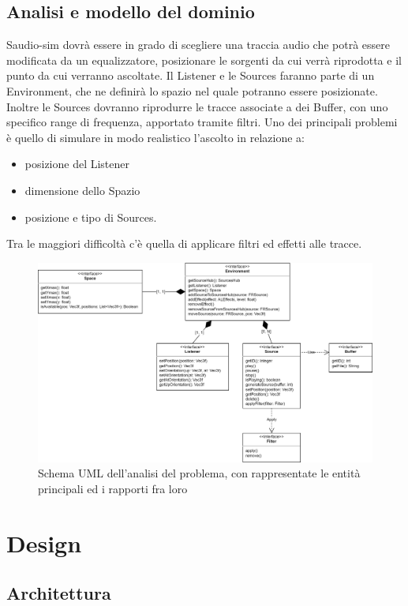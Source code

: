 \documentclass[a4paper,12pt]{report}
\begin{document}
\section{Analisi e modello del dominio}
Saudio-sim dovrà essere in grado di scegliere una traccia audio che potrà essere modificata da un equalizzatore, posizionare le sorgenti da cui verrà riprodotta e il punto da cui verranno ascoltate. Il Listener e le Sources faranno parte di un Environment, che ne definirà lo spazio nel quale potranno essere posizionate. Inoltre le Sources dovranno riprodurre le tracce associate a dei Buffer, con uno specifico range di frequenza, apportato tramite filtri.
%
Uno dei principali problemi è quello di simulare in modo realistico l'ascolto in relazione a: 
\begin{itemize}
	\item posizione del Listener 
	\item dimensione dello Spazio 
	\item posizione e tipo di Sources. 
\end{itemize}
Tra le maggiori difficoltà c'è quella di applicare filtri ed effetti alle tracce.
%
\begin{figure}[H]
\centering{}
\includegraphics[width=\textwidth]{img/analysis.png}
\caption{Schema UML dell'analisi del problema, con rappresentate le entità principali ed i rapporti fra loro}
\label{img:analysis}
\end{figure}

\chapter{Design}
\section{Architettura}
\end{document}
